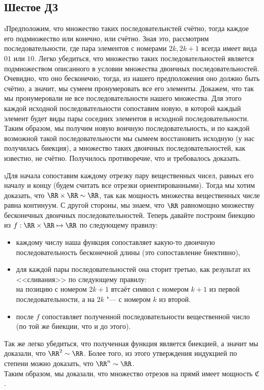 \subsection{Шестое ДЗ}


\i Предположим, что множество таких последовательнстей счётно, тогда каждое его подмножество или конечно, или счётно. Зная это, рассмотрим последовательности, где пара элементов с номерами $2k, 2k+1$ всегда имеет вида $01$ или $10$. Легко убедиться, что множество таких последовательностей является подмножеством описанного в условии множества двоичных последовательностей. Очевидно, что оно бесконечно, тогда, из нашего предположения оно должно быть счётно, а значит, мы сумеем пронумеровать все его элементы. Докажем, что так мы пронумеровали не все последовательности нашего множества. Для этого каждой исходной последовательности сопоставим новую, в которой каждый элемент будет виды пары соседних элементов в исходной последовательности. Таким образом, мы получим новую воичную последовательность, и по каждой возможной такой последовательности мы сымеем восстановить исходную (у нас получилась биекция), а множество таких двоичных последовательностей, как известно, не счётно. Получилось противоречие, что и требовалось доказать.

\i Для начала сопоставим каждому отрезку пару вещественных чисел, равных его началу и концу (будем считать все отрезки ориентированными). Тогда мы хотим доказать, что $\RR \times \RR \sim \RR$, так как мощность множества вещественных числе равна континуум. С другой стороны, мы знаем, что $\RR$ равномощно множеству бесконечных двоичных последовательностей. Теперь давайте построим биекцию из $f: \RR \times \RR \mapsto \RR$ по следующему правилу:
\begin{itemize}
    \item каждому числу наша функция сопоставляет какую-то двоичную последовательность бесконечной длины (это сопоставление биективно),
    \item для каждой пары последовательностей она сторит третью, как результат их <<сливания>> по следующему правилу:\\
    на позицию с номером $2k+1$ втсаёт символ с номером $k+1$ из первой последовательности, а на $2k$ "--- с номером $k$ из второй.
    \item после $f$ сопоставляет полученной последовательности вещественной число (по той же биекции, что и до этого).
\end{itemize}
Так же легко убедиться, что полученная функция является биекцией, а значит мы доказали, что $\RR^2 \sim \RR$. Более того, из этого утверждения индукцией по степени можно доказать, что $\RR^n \sim \RR$.\\
Таким образом, мы доказали, что множество отрезов на прямй имеет мощность $\mathfrak{C}$.

